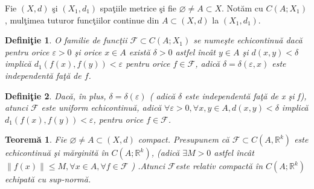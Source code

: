 \documentclass[a4paper,12pt,oneside]{report}
\newtheorem{definition}{Defini\c tie}
\newtheorem{theorem}{Teorem\u a}
\begin{document}
Fie \(\left ( X,d \right )\) \c{s}i \(\left ( X_{1},d_{1} \right )\) spa\c{t}iile metrice \c{s}i fie \(\varnothing \neq A\subset X\). Not\u{a}m cu \(C\left ( A;X_{1} \right )\), mul\c{t}imea tuturor func\c{t}iilor continue din \(A\subset \left ( X,d \right )\) la \(\left ( X_{1},d_{1} \right )\).
\begin{definition}
O familie de func\c{t}ii \(\mathcal{F} \subset C\left ( A;X_{1} \right )\) se nume\c{s}te echicontinu\u{a} dac\u{a} pentru orice \(\varepsilon > 0\) \c{s}i orice \(x \in A\) exist\u{a} \(\delta > 0\) astfel \^{i}nc\^{a}t \(y \in A\) \c{s}i \(d\left ( x,y \right )< \delta \) implic\u{a} \(d_{1}\left ( f\left ( x \right ),f\left ( y \right ) \right )< \varepsilon \) pentru orice \(f \in \mathcal{F} \), adic\u{a} \(\delta =\delta \left ( \varepsilon ,x \right )\) este independent\u{a} fa\c{t}\u{a} de \(f\). 
\end{definition}
\begin{definition}
Dac\u{a}, \^{i}n plus, \(\delta =\delta \left ( \varepsilon  \right )\) ( adic\u{a} \(\delta\) este independent\u{a} fa\c{t}\u{a} de x \c{s}i f), atunci \(\mathcal{F}\) este uniform echicontinu\u{a}, adic\u{a} \(\forall \varepsilon > 0, \forall x,y \in A, d\left ( x,y \right )< \delta \) implic\u{a} \(d_{1}\left ( f\left ( x \right ), f\left ( y \right ) \right )< \varepsilon \), pentru orice \(f\in \mathcal{F}\). 
\end{definition}
\begin{theorem}
Fie \(\varnothing \neq A\subset \left ( X,d \right )\) compact. Presupunem c\u{a} \(\mathcal{F} \subset C\left ( A,\mathbb{R}^{k} \right )\) este echicontinu\u{a} \c{s}i m\u{a}rginit\u{a} \^{i}n \(C\left ( A;\mathbb{R}^{k} \right )\), (adic\u{a} \(\exists M> 0\) astfel \^{i}nc\^{a}t \(\left \| f\left ( x \right ) \right \| \leq M, \forall x \in A, \forall f \in \mathcal{F}\) ) .Atunci \(\mathcal{F}\)este relativ compact\u{a} \^{i}n \(C\left ( A;\mathbb{R}^{k} \right )\) echipat\u{a} cu sup-norm\u{a}. 
\end{theorem}
\end{document}
